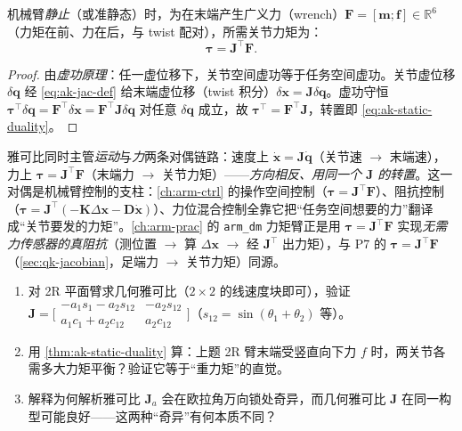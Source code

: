 \begin{theorem}[静力学对偶：$\boldsymbol{\tau}=\mathbf{J}^\top\mathbf{F}$]\label{thm:ak-static-duality}
机械臂\emph{静止}（或准静态）时，为在末端产生广义力（wrench）$\mathbf{F}=[\mathbf{m};\mathbf{f}]\in\mathbb{R}^6$（力矩在前、力在后，与 twist 配对），所需关节力矩为\cite{lynch2017modern}：
\begin{equation}
  \boxed{\boldsymbol{\tau}=\mathbf{J}^\top\mathbf{F}.}
  \label{eq:ak-static-duality}
\end{equation}
\end{theorem}
\begin{proof}
由\emph{虚功原理}：任一虚位移下，关节空间虚功等于任务空间虚功。关节虚位移 $\delta\mathbf{q}$ 经 \cref{eq:ak-jac-def} 给末端虚位移（twist 积分）$\delta\mathbf{x}=\mathbf{J}\delta\mathbf{q}$。虚功守恒 $\boldsymbol{\tau}^\top\delta\mathbf{q}=\mathbf{F}^\top\delta\mathbf{x}=\mathbf{F}^\top\mathbf{J}\delta\mathbf{q}$ 对任意 $\delta\mathbf{q}$ 成立，故 $\boldsymbol{\tau}^\top=\mathbf{F}^\top\mathbf{J}$，转置即 \cref{eq:ak-static-duality}。
\end{proof}

\begin{insight}
雅可比同时主管\emph{运动}与\emph{力}两条对偶链路：速度上 $\dot{\mathbf{x}}=\mathbf{J}\dot{\mathbf{q}}$（关节速 $\to$ 末端速），力上 $\boldsymbol{\tau}=\mathbf{J}^\top\mathbf{F}$（末端力 $\to$ 关节力矩）——\emph{方向相反、用同一个 $\mathbf{J}$ 的转置}。这一对偶是机械臂控制的支柱：\cref{ch:arm-ctrl} 的操作空间控制（$\boldsymbol{\tau}=\mathbf{J}^\top\mathbf{F}$）、阻抗控制（$\boldsymbol{\tau}=\mathbf{J}^\top(-\mathbf{K}\Delta\mathbf{x}-\mathbf{D}\dot{\mathbf{x}})$）、力位混合控制全靠它把“任务空间想要的力”翻译成“关节要发的力矩”。\cref{ch:arm-prac} 的 \texttt{arm\_dm} 力矩臂正是用 $\boldsymbol{\tau}=\mathbf{J}^\top\mathbf{F}$ 实现\emph{无需力传感器的真阻抗}（测位置 $\to$ 算 $\Delta\mathbf{x}$ $\to$ 经 $\mathbf{J}^\top$ 出力矩），与 P7 的 $\boldsymbol{\tau}=\mathbf{J}^\top\mathbf{F}$（\cref{sec:qk-jacobian}，足端力 $\to$ 关节力矩）同源。
\end{insight}

\begin{practice}
\begin{enumerate}
  \item 对 2R 平面臂求几何雅可比（$2\times2$ 的线速度块即可），验证 $\mathbf{J}=\big[\begin{smallmatrix}-a_1 s_1-a_2 s_{12} & -a_2 s_{12}\\ a_1 c_1+a_2 c_{12} & a_2 c_{12}\end{smallmatrix}\big]$（$s_{12}=\sin(\theta_1+\theta_2)$ 等）。
  \item 用 \cref{thm:ak-static-duality} 算：上题 2R 臂末端受竖直向下力 $f$ 时，两关节各需多大力矩平衡？验证它等于“重力矩”的直觉。
  \item 解释为何解析雅可比 $\mathbf{J}_a$ 会在欧拉角万向锁处奇异，而几何雅可比 $\mathbf{J}$ 在同一构型可能良好——这两种“奇异”有何本质不同？
\end{enumerate}
\end{practice}

